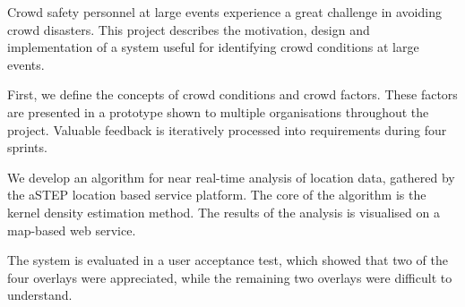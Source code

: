 {
\setlength{\parskip}{0.5em}
Crowd safety personnel at large events experience a great challenge in avoiding crowd disasters. This project describes the motivation, design and implementation of a system useful for identifying crowd conditions at large events.

First, we define the concepts of crowd conditions and crowd factors. These factors are presented in a prototype shown to multiple organisations throughout the project. Valuable feedback is iteratively processed into requirements during four sprints.

We develop an algorithm for near real-time analysis of location data, gathered by the aSTEP location based service platform. The core of the algorithm is the kernel density estimation method. The results of the analysis is visualised on a map-based web service.

The system is evaluated in a user acceptance test, which showed that two of the four overlays were appreciated, while the remaining two overlays were difficult to understand.
}


